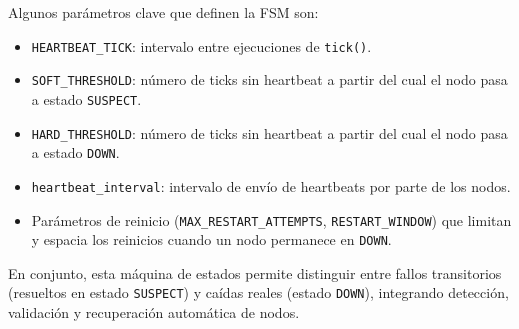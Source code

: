 Algunos parámetros clave que definen la FSM son:

\begin{itemize}
    \item \texttt{HEARTBEAT\_TICK}: intervalo entre ejecuciones de \texttt{tick()}.
    \item \texttt{SOFT\_THRESHOLD}: número de ticks sin heartbeat a partir del cual el nodo pasa a estado \texttt{SUSPECT}.
    \item \texttt{HARD\_THRESHOLD}: número de ticks sin heartbeat a partir del cual el nodo pasa a estado \texttt{DOWN}.
    \item \texttt{heartbeat\_interval}: intervalo de envío de heartbeats por parte de los nodos.
    \item Parámetros de reinicio (\texttt{MAX\_RESTART\_ATTEMPTS}, \texttt{RESTART\_WINDOW}) que limitan y espacia los reinicios cuando un nodo permanece en \texttt{DOWN}.
\end{itemize}

En conjunto, esta máquina de estados permite distinguir entre fallos transitorios (resueltos en estado \texttt{SUSPECT}) y caídas reales (estado \texttt{DOWN}), integrando detección, validación y recuperación automática de nodos.